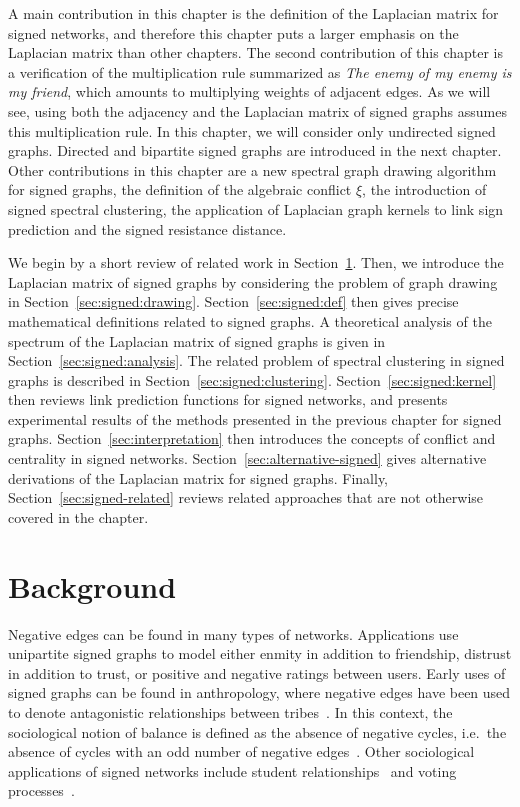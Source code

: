 \documentclass[11pt,a4paper]{book}
\begin{document}
A main contribution in this chapter is the definition of the Laplacian
matrix for signed networks, and therefore this chapter puts a larger
emphasis on the Laplacian matrix than other chapters.  
The second contribution of this chapter is a verification of the
multiplication rule summarized as \emph{The enemy of
my enemy is my friend}, which amounts to multiplying weights of
adjacent edges.  As we will see, using both the adjacency and the
Laplacian matrix of  
signed graphs assumes this multiplication rule. 
In this chapter,
we will consider only undirected signed graphs.  Directed and bipartite signed graphs
are introduced in the next chapter. 
Other contributions in this chapter are a new spectral graph drawing
algorithm for signed graphs, the definition of the algebraic conflict
$\xi$, the introduction of signed spectral clustering, the application
of Laplacian graph kernels to link sign prediction and the signed
resistance distance. 

We begin by a short review of related work in Section~\ref{sec:signed-background}.
Then, we introduce the Laplacian matrix of signed graphs by considering
the problem of graph drawing in Section~\ref{sec:signed:drawing}. 
Section~\ref{sec:signed:def} then gives precise mathematical definitions
related to signed graphs.
A theoretical analysis of the spectrum of the Laplacian matrix of signed
graphs is given in Section~\ref{sec:signed:analysis}. 
The related problem of spectral clustering in signed graphs is described
in Section~\ref{sec:signed:clustering}.
Section~\ref{sec:signed:kernel} then reviews link prediction functions
for signed networks, and presents experimental results of the methods
presented in the previous chapter for signed graphs. 
Section~\ref{sec:interpretation} then introduces the concepts of
conflict and centrality in signed networks. 
Section~\ref{sec:alternative-signed} gives alternative
derivations of the Laplacian matrix for signed graphs. 
Finally, Section~\ref{sec:signed-related} reviews related approaches
that are not otherwise covered in the chapter. 

\section{Background}
\label{sec:signed-background}
Negative edges can be found in many types of networks. 
Applications use unipartite signed graphs to model either
enmity in addition to friendship, distrust in addition
to trust, or positive and negative ratings between users. 
Early uses of signed graphs can be found
in anthropology, where negative edges have been used to denote
antagonistic relationships between tribes~\cite{b323}. 
In this context, the sociological notion of balance is defined as the
absence of negative cycles, i.e.\ the absence of cycles with an odd
number of negative edges~\cite{b355,b284}.  
Other sociological applications of signed networks include student
relationships~\cite{b493} and voting processes~\cite{b551}. 
\end{document}
